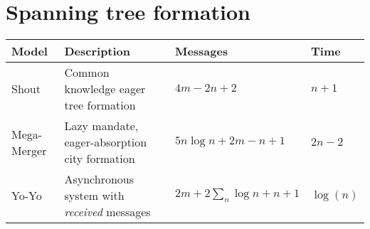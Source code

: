 \section{Spanning tree formation}
\begin{table}[h]
\begin{tabular}{llll}
			\textbf{Model}		& \textbf{Description}						& \textbf{Messages}						& \textbf{Time} \\
	\hline 	Shout 				& Common knowledge eager tree formation		& $4m - 2n + 2$							& $n + 1$ \\
	\hline 	Mega-Merger 		& Lazy mandate, eager-absorption city formation
																			& $5n \log{n} + 2m - n + 1$				& $2n - 2$ \\
	\hline 	Yo-Yo				& Asynchronous system with \emph{received} messages
																			& $2m + 2\sum_{n}{\log{n}} + n + 1$		& $\log(n)$ \\
\end{tabular}
\end{table}
